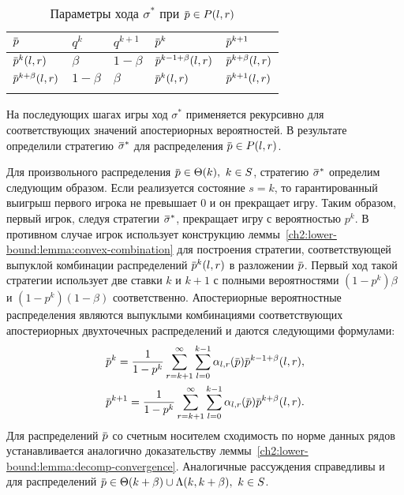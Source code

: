 \begin{table}[htb]
  \centering
  \renewcommand{\arraystretch}{1.5}
  \captionsetup{width=12cm}
  \caption{Параметры хода $\sigma^*$ при $\p \in P(l, r)$}
  \label{ch2:tab:insider-strategy}
  \begin{tabular}{|P{2cm}||P{2cm}|P{2cm}|P{2cm}|P{2cm}|}
    \hline
    \hline
    $\p$                 & $q^k$     & $q^{k+1}$ & $\p^{k}$               & $\p^{k+1}$           \\ \hline
    $\p^k(l, r)$         & $\beta$   & $1-\beta$ & $\p^{k-1+\beta}(l, r)$ & $\p^{k+\beta}(l, r)$ \\ \hline
    $\p^{k+\beta}(l, r)$ & $1-\beta$ & $\beta$   & $\p^k(l, r)$           & $\p^{k+1}(l, r)$     \\
    \hline
    \hline
    \vspace{-2.5em}
  \end{tabular}
\end{table}

На последующих шагах игры ход $\sigma^*$ применяется рекурсивно для соответствующих значений апостериорных вероятностей.
В результате определили стратегию $\sigmav^*$ для распределения $\p \in P(l,r)$.

Для произвольного распределения $\p \in \Theta(k),\ k \in S$, стратегию $\sigmav^*$ определим следующим образом.
Если реализуется состояние $s = k$, то гарантированный выигрыш первого игрока не превышает $0$ и он прекращает игру.
Таким образом, первый игрок, следуя стратегии $\sigmav^*$, прекращает игру с вероятностью $p^k$.
В противном случае игрок использует конструкцию леммы~\ref{ch2:lower-bound:lemma:convex-combination} для построения стратегии, соответствующей выпуклой комбинации распределений $\p^k(l, r)$ в разложении $\p$.
Первый ход такой стратегии использует две ставки $k$ и $k+1$ с полными вероятностями $(1-p^k)\beta$ и $(1-p^k)(1-\beta)$ соответственно.
Апостериорные вероятностные распределения являются выпуклыми комбинациями соответствующих апостериорных двухточечных распределений и даются следующими формулами:
\begin{gather*}
  \p^k = \frac{1}{1-p^k} \sum_{r=k+1}^\infty \sum_{l=0}^{k-1} \alpha_{l,r}(\p) \p^{k-1+\beta}(l, r), \\
  \p^{k+1} = \frac{1}{1-p^k} \sum_{r=k+1}^\infty \sum_{l=0}^{k-1} \alpha_{l,r}(\p) \p^{k+\beta}(l, r).
\end{gather*}
Для распределений $\p$ со счетным носителем сходимость по норме данных рядов устанавливается аналогично доказательству леммы~\ref{ch2:lower-bound:lemma:decomp-convergence}.
Аналогичные рассуждения справедливы и для распределений $\p \in \Theta(k+\beta) \cup \Lambda(k, k+\beta),\ k \in S$.

